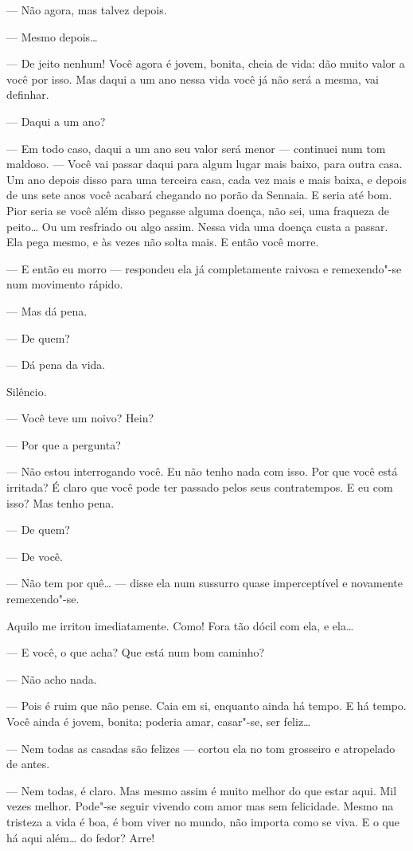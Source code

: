 --- Não agora, mas talvez depois.

--- Mesmo depois\ldots{}

--- De jeito nenhum! Você agora é jovem, bonita, cheia de vida: dão muito
valor a você por isso. Mas daqui a um ano nessa vida você já não será a
mesma, vai definhar.

--- Daqui a um ano?

--- Em todo caso, daqui a um ano seu valor será menor --- continuei num tom
maldoso. --- Você vai passar daqui para algum lugar mais baixo, para
outra casa. Um ano depois disso para uma terceira casa, cada vez mais e
mais baixa, e depois de uns sete anos você acabará chegando no porão da
Sennaia. E seria até bom. Pior seria se você além disso pegasse alguma
doença, não sei, uma fraqueza de peito\ldots{} Ou um resfriado ou algo
assim. Nessa vida uma doença custa a passar. Ela pega mesmo, e às vezes
não solta mais. E então você morre.

--- E então eu morro --- respondeu ela já completamente raivosa e
remexendo"-se num movimento rápido.

--- Mas dá pena.

--- De quem?

--- Dá pena da vida.

Silêncio.

--- Você teve um noivo? Hein?

--- Por que a pergunta?

--- Não estou interrogando você. Eu não tenho nada com isso. Por que você
está irritada? É claro que você pode ter passado pelos seus
contratempos. E eu com isso? Mas tenho pena.

--- De quem?

--- De você.

--- Não tem por quê\ldots{} --- disse ela num sussurro quase imperceptível e
novamente remexendo"-se.

Aquilo me irritou imediatamente. Como! Fora tão dócil com ela, e ela\ldots{}

--- E você, o que acha? Que está num bom caminho?

--- Não acho nada.

--- Pois é ruim que não pense. Caia em si, enquanto ainda há tempo. E há
tempo. Você ainda é jovem, bonita; poderia amar, casar"-se, ser feliz\ldots{}

--- Nem todas as casadas são felizes --- cortou ela no tom grosseiro e
atropelado de antes.

--- Nem todas, é claro. Mas mesmo assim é muito melhor do que estar aqui.
Mil vezes melhor. Pode"-se seguir vivendo com amor mas sem felicidade.
Mesmo na tristeza a vida é boa, é bom viver no mundo, não importa como
se viva. E o que há aqui além\ldots{} do fedor? Arre!

